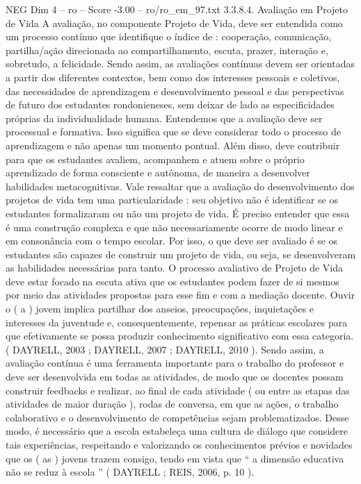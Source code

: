 \begin{textsample}{NEG Dim 4 – ro – Score -3.00 – ro/ro\_em\_97.txt}  \label{ex:f4_neg_074}
3.3.8.4.
Avaliação em Projeto de Vida A avaliação, no componente Projeto de Vida, deve ser entendida como um processo contínuo que identifique o índice de : cooperação, comunicação, partilha/ação direcionada ao compartilhamento, escuta, prazer, interação e, sobretudo, a felicidade.
Sendo assim, as avaliações contínuas devem ser orientadas a partir dos diferentes contextos, bem como dos interesses pessoais e coletivos, das necessidades de aprendizagem e desenvolvimento pessoal e das perspectivas de futuro dos estudantes rondonieneses, sem deixar de lado as especificidades próprias da individualidade humana.
Entendemos que a avaliação deve ser processual e formativa.
Isso significa que se deve considerar todo o processo de aprendizagem e não apenas um momento pontual.
Além disso, deve contribuir para que os estudantes avaliem, acompanhem e atuem sobre o próprio aprendizado de forma consciente e autônoma, de maneira a desenvolver habilidades metacognitivas.
Vale ressaltar que a avaliação do desenvolvimento dos projetos de vida tem uma particularidade : seu objetivo não é identificar se os estudantes formalizaram ou não um projeto de vida.
É preciso entender que essa é uma construção complexa e que não necessariamente ocorre de modo linear e em consonância com o tempo escolar.
Por isso, o que deve ser avaliado é se os estudantes são capazes de construir um projeto de vida, ou seja, se desenvolveram as habilidades necessárias para tanto.
O processo avaliativo de Projeto de Vida deve estar focado na escuta ativa que os estudantes podem fazer de si mesmos por meio das atividades propostas para esse fim e com a mediação docente.
Ouvir o ( a ) jovem implica partilhar dos anseios, preocupações, inquietações e interesses da juventude e, consequentemente, repensar as práticas escolares para que efetivamente se possa produzir conhecimento significativo com essa categoria. ( DAYRELL, 2003 ; DAYRELL, 2007 ; DAYRELL, 2010 ).
Sendo assim, a avaliação contínua é uma ferramenta importante para o trabalho do professor e deve ser desenvolvida em todas as atividades, de modo que os docentes possam construir feedbacks e realizar, ao final de cada atividade ( ou entre as etapas das atividades de maior duração ), rodas de conversa, em que as ações, o trabalho colaborativo e o desenvolvimento de competências sejam problematizados.
Desse modo, é necessário que a escola estabeleça uma cultura de diálogo que considere tais experiências, respeitando e valorizando os conhecimentos prévios e novidades que os ( as ) jovens trazem consigo, tendo em vista que “ a dimensão educativa não se reduz à escola ” ( DAYRELL ; REIS, 2006, p. 10 ).

\end{textsample}
